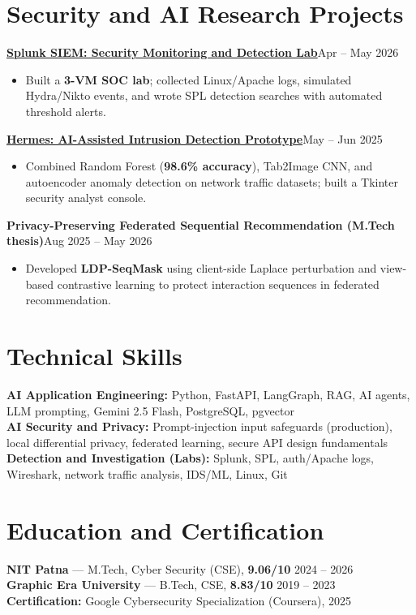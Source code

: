 \documentclass[a4paper,11pt]{article}
\newcommand{\proj}[2]{\textbf{#1}\hfill{\footnotesize #2}\vspace{-4pt}}
\newenvironment{tightbullets}{\begin{itemize}[leftmargin=1.25em,label=\textbullet,topsep=2pt,itemsep=2pt,parsep=0pt,partopsep=0pt]}{\end{itemize}\vspace{-4pt}}
\newcommand{\skill}[2]{\textbf{#1:} #2\\[1pt]}
\begin{document}
\section{Security and AI Research Projects}
\proj{\href{https://github.com/devanshukranjan/AI-Cybersecurity-Portfolio/tree/main/siem-investigations/splunk-siem-lab}{Splunk SIEM: Security Monitoring and Detection Lab}}{Apr -- May 2026}
\begin{tightbullets}
\item Built a \textbf{3-VM SOC lab}; collected Linux/Apache logs, simulated Hydra/Nikto events, and wrote SPL detection searches with automated threshold alerts.
\end{tightbullets}
\proj{\href{https://github.com/devanshukranjan/AI-Cybersecurity-Portfolio/tree/main/ai-intrusion-detection/hermes-ids}{Hermes: AI-Assisted Intrusion Detection Prototype}}{May -- Jun 2025}
\begin{tightbullets}
\item Combined Random Forest (\textbf{98.6\% accuracy}), Tab2Image CNN, and autoencoder anomaly detection on network traffic datasets; built a Tkinter security analyst console.
\end{tightbullets}
\proj{Privacy-Preserving Federated Sequential Recommendation (M.Tech thesis)}{Aug 2025 -- May 2026}
\begin{tightbullets}
\item Developed \textbf{LDP-SeqMask} using client-side Laplace perturbation and view-based contrastive learning to protect interaction sequences in federated recommendation.
\end{tightbullets}

\section{Technical Skills}
{\small
\skill{AI Application Engineering}{Python, FastAPI, LangGraph, RAG, AI agents, LLM prompting, Gemini 2.5 Flash, PostgreSQL, pgvector}
\skill{AI Security and Privacy}{Prompt-injection input safeguards (production), local differential privacy, federated learning, secure API design fundamentals}
\skill{Detection and Investigation (Labs)}{Splunk, SPL, auth/Apache logs, Wireshark, network traffic analysis, IDS/ML, Linux, Git}
}
\section{Education and Certification}
{\small\textbf{NIT Patna} --- M.Tech, Cyber Security (CSE), \textbf{9.06/10} \hfill 2024 -- 2026\\[1pt]
\textbf{Graphic Era University} --- B.Tech, CSE, \textbf{8.83/10} \hfill 2019 -- 2023\\[1pt]
\textbf{Certification:} Google Cybersecurity Specialization (Coursera), 2025}
\end{document}

